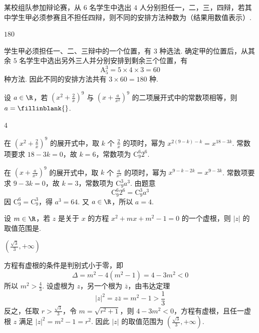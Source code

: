 \begin{problem}
某校组队参加辩论赛，从 \(6\) 名学生中选出 \(4\) 人分别担任一，二，三，四辩，若其中学生甲必须参赛且不担任四辩，则不同的安排方法种数为\fillinblank{}（结果用数值表示）.
\end{problem}

\begin{answer}
\(180\)
\end{answer}

\begin{solution}
学生甲必须担任一、二、三辩中的一个位置，有 \(3\) 种选法. 确定甲的位置后，从其余 \(5\) 名学生中选出另外三人并分别安排到剩余三个位置，有
\[
\mathrm A_5^3=5\times4\times3=60
\]
种方法. 因此不同的安排方法共有 \(3\times60=180\) 种.
\end{solution}

\begin{problem}
设 \(a\in\R\)，若 \(\left(x^2+\frac{2}{x}\right)^9\) 与 \(\left(x+\frac{a}{x^2}\right)^9\) 的二项展开式中的常数项相等，则 \(a=\fillinblank{}\).
\end{problem}

\begin{answer}
\(4\)
\end{answer}

\begin{solution}
在 \(\left(x^2+\frac2x\right)^9\) 的展开式中，取 \(k\) 个 \(\frac2x\) 的项时，幂为 \(x^{2(9-k)-k}=x^{18-3k}\). 常数项要求 \(18-3k=0\)，故 \(k=6\)，常数项为 \(\mathrm C_9^6 2^6\).

在 \(\left(x+\frac{a}{x^2}\right)^9\) 的展开式中，取 \(k\) 个 \(\frac{a}{x^2}\) 的项时，幂为 \(x^{9-k-2k}=x^{9-3k}\). 常数项要求 \(9-3k=0\)，故 \(k=3\)，常数项为 \(\mathrm C_9^3a^3\). 由题意
\[
\mathrm C_9^6 2^6=\mathrm C_9^3a^3
\]
因 \(\mathrm C_9^6=\mathrm C_9^3\)，得 \(a^3=64\). 又 \(a\in\R\)，所以 \(a=4\).
\end{solution}

\begin{problem}
设 \(m\in\R\)，若 \(z\) 是关于 \(x\) 的方程 \(x^2+mx+m^2-1=0\) 的一个虚根，则 \(\lvert z\rvert\) 的取值范围是\fillinblank{}.
\end{problem}

\begin{answer}
\(\left(\frac{\sqrt3}{3},+\infty\right)\)
\end{answer}

\begin{solution}
方程有虚根的条件是判别式小于零，即
\[
\Delta=m^2-4(m^2-1)=4-3m^2<0
\]
所以 \(m^2>\frac43\). 设虚根为 \(z\)，另一个根为 \(\overline z\)，由韦达定理
\[
\lvert z\rvert^2=z\overline z=m^2-1>\frac13
\]
反之，任取 \(r>\frac{\sqrt3}{3}\)，令 \(m=\sqrt{r^2+1}\)，则 \(4-3m^2<0\)，方程有虚根，且任一虚根 \(z\) 满足 \(\lvert z\rvert^2=m^2-1=r^2\). 因此 \(\lvert z\rvert\) 的取值范围为 \(\left(\frac{\sqrt3}{3},+\infty\right)\).
\end{solution}

